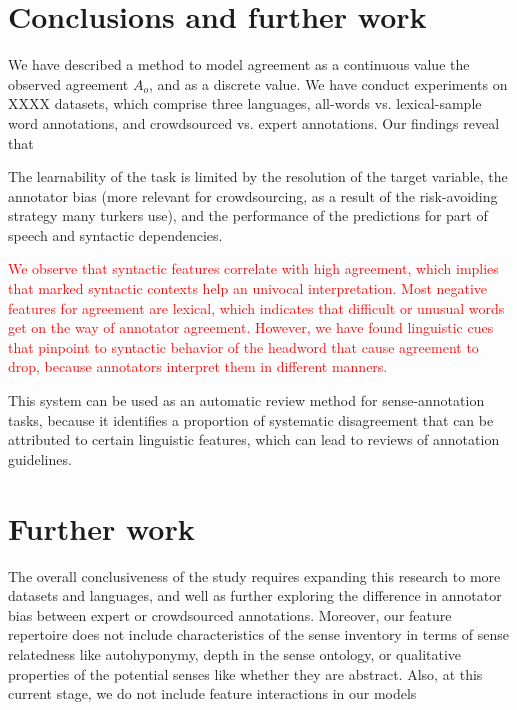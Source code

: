 \documentclass[11pt,a4paper]{article}
\begin{document}
\section{Conclusions and further work}

We have described a method to model agreement as a continuous value  the observed agreement $A_o$, and as a discrete value. We have conduct experiments on XXXX datasets, which comprise three languages, all-words vs. lexical-sample word annotations, and crowdsourced vs. expert annotations. Our findings reveal that 

 The learnability of the task is limited by the resolution of the target variable, the annotator bias (more relevant for crowdsourcing, as a result of the risk-avoiding strategy many turkers use), and the performance of the predictions for part of speech and syntactic dependencies.


\textcolor{red}{We observe that syntactic features correlate with high agreement, which implies that marked syntactic contexts help an univocal interpretation. Most negative features for agreement are lexical, which indicates that difficult or unusual words get on the way of annotator agreement. However, we have found linguistic cues that pinpoint to syntactic behavior of the headword that cause agreement to drop, because annotators interpret them in different manners. }

This system can be used as an automatic review method for sense-annotation tasks, because it identifies a proportion of systematic disagreement that can be attributed to certain linguistic features, which can lead to reviews of annotation guidelines. 


\section{Further work}
The overall conclusiveness of the study requires expanding this research to more datasets and languages, and well as further exploring the difference in annotator bias between  expert or crowdsourced annotations. Moreover, our feature repertoire does not include characteristics of the sense inventory in terms of sense relatedness like autohyponymy, depth in the sense ontology, or qualitative properties of the potential senses like whether they are abstract. Also, at this current stage, we do not include feature interactions in our models



\end{document}
